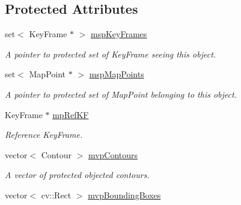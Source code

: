 \subsection*{Protected Attributes}
\begin{DoxyCompactItemize}
\item 
set$<$ Key\+Frame $\ast$ $>$ \hyperlink{classMapObject_a5f3bff0cc5df8055d3977ca076ed88f4}{msp\+Key\+Frames}\hypertarget{classMapObject_a5f3bff0cc5df8055d3977ca076ed88f4}{}\label{classMapObject_a5f3bff0cc5df8055d3977ca076ed88f4}

\begin{DoxyCompactList}\small\item\em A pointer to protected set of Key\+Frame seeing this object. \end{DoxyCompactList}\item 
set$<$ Map\+Point $\ast$ $>$ \hyperlink{classMapObject_ad15e9525606cb41c56bfe60052f0defd}{msp\+Map\+Points}\hypertarget{classMapObject_ad15e9525606cb41c56bfe60052f0defd}{}\label{classMapObject_ad15e9525606cb41c56bfe60052f0defd}

\begin{DoxyCompactList}\small\item\em A pointer to protected set of Map\+Point belonging to this object. \end{DoxyCompactList}\item 
Key\+Frame $\ast$ \hyperlink{classMapObject_a2dc3557579e5cf351e74cff748798623}{mp\+Ref\+KF}\hypertarget{classMapObject_a2dc3557579e5cf351e74cff748798623}{}\label{classMapObject_a2dc3557579e5cf351e74cff748798623}

\begin{DoxyCompactList}\small\item\em Reference Key\+Frame. \end{DoxyCompactList}\item 
vector$<$ Contour $>$ \hyperlink{classMapObject_a407ac46d2cb12c87d280fe633a826d04}{mvp\+Contours}\hypertarget{classMapObject_a407ac46d2cb12c87d280fe633a826d04}{}\label{classMapObject_a407ac46d2cb12c87d280fe633a826d04}

\begin{DoxyCompactList}\small\item\em A vector of protected objected contours. \end{DoxyCompactList}\item 
vector$<$ cv\+::\+Rect $>$ \hyperlink{classMapObject_a34ece750cdc137c7e58a7688926d3a47}{mvp\+Bounding\+Boxes}\hypertarget{classMapObject_a34ece750cdc137c7e58a7688926d3a47}{}\label{classMapObject_a34ece750cdc137c7e58a7688926d3a47}


\end{DoxyCompactItemize}
